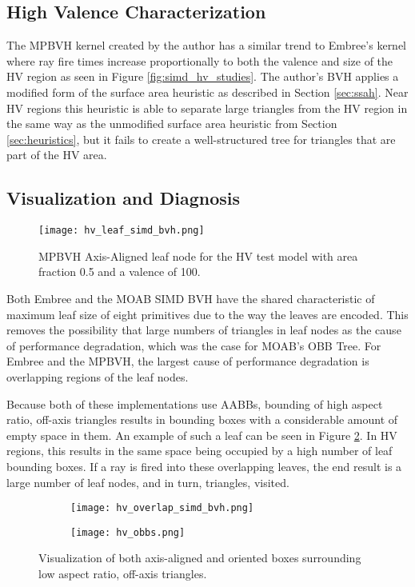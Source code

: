 \subsection{High Valence Characterization}

The MPBVH kernel created by the author has a similar trend to Embree's kernel
where ray fire times increase proportionally to both the valence and size of the
HV region as seen in Figure \ref{fig:simd_hv_studies}. The author's BVH applies
a modified form of the surface area heuristic as described in Section
\ref{sec:ssah}. Near HV regions this heuristic is able to separate large
triangles from the HV region in the same way as the unmodified surface area
heuristic from Section \ref{sec:heuristics}, but it fails to create a
well-structured tree for triangles that are part of the HV area.

\subsection{Visualization and Diagnosis}

\begin{figure}
  \centering
  \texttt{[image: hv\_leaf\_simd\_bvh.png]}
  \caption[Axis-aligned bounding box in the high valence region.]{MPBVH
    Axis-Aligned leaf node for the HV test model with area fraction 0.5 and a
    valence of 100.}
  \label{fig:hv_leaf_simd_bvh}
\end{figure}
  
Both Embree and the MOAB SIMD BVH have the shared characteristic of maximum leaf
size of eight primitives due to the way the leaves are encoded. This removes the
possibility that large numbers of triangles in leaf nodes as the cause of
performance degradation, which was the case for MOAB's OBB Tree. For Embree and
the MPBVH, the largest cause of performance degradation is overlapping regions
of the leaf nodes.

Because both of these implementations use AABBs, bounding of high aspect ratio,
off-axis triangles results in bounding boxes with a considerable amount of empty
space in them. An example of such a leaf can be seen in Figure
\ref{fig:hv_overlap_simd_bvh}. In HV regions, this results in the same
space being occupied by a high number of leaf bounding boxes. If a ray is fired
into these overlapping leaves, the end result is a large number of leaf nodes,
and in turn, triangles, visited.

\begin{figure}
  \centering
  \begin{subfigure}[b]{.5\textwidth}
    \centering
    \texttt{[image: hv\_overlap\_simd\_bvh.png]}
  \end{subfigure}%
  \hfill
  \begin{subfigure}[b]{.5\textwidth}
    \centering
    \texttt{[image: hv\_obbs.png]}
  \end{subfigure}
  \caption[Bounding boxes of the MPBVH in the high valence
    region.]{Visualization of both axis-aligned and oriented boxes surrounding
    low aspect ratio, off-axis triangles.}
  \label{fig:hv_overlap_simd_bvh}
\end{figure}

